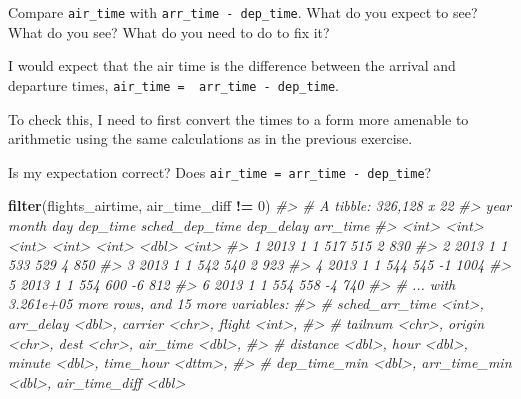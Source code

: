 \documentclass[]{book}
\newenvironment{Shaded}{\begin{snugshade}}{\end{snugshade}}
\newcommand{\CommentTok}[1]{\textcolor[rgb]{0.56,0.35,0.01}{\textit{#1}}}
\newcommand{\DataTypeTok}[1]{\textcolor[rgb]{0.13,0.29,0.53}{#1}}
\newcommand{\DecValTok}[1]{\textcolor[rgb]{0.00,0.00,0.81}{#1}}
\newcommand{\KeywordTok}[1]{\textcolor[rgb]{0.13,0.29,0.53}{\textbf{#1}}}
\newcommand{\NormalTok}[1]{#1}
\newcommand{\OperatorTok}[1]{\textcolor[rgb]{0.81,0.36,0.00}{\textbf{#1}}}
\newcommand{\StringTok}[1]{\textcolor[rgb]{0.31,0.60,0.02}{#1}}
\theoremstyle{plain}
\theoremstyle{remark}
\begin{document}
Compare \texttt{air\_time} with \texttt{arr\_time\ -\ dep\_time}. What
do you expect to see? What do you see? What do you need to do to fix it?

I would expect that the air time is the difference between the arrival
and departure times, \texttt{air\_time\ =\ \ arr\_time\ -\ dep\_time}.

To check this, I need to first convert the times to a form more amenable
to arithmetic using the same calculations as in the previous exercise.

\begin{Shaded}
\end{Shaded}

Is my expectation correct? Does
\texttt{air\_time\ =\ arr\_time\ -\ dep\_time}?

\begin{Shaded}
\begin{Highlighting}[]
\KeywordTok{filter}\NormalTok{(flights_airtime, air_time_diff }\OperatorTok{!=}\StringTok{ }\DecValTok{0}\NormalTok{)}
\CommentTok{#> # A tibble: 326,128 x 22}
\CommentTok{#>    year month   day dep_time sched_dep_time dep_delay arr_time}
\CommentTok{#>   <int> <int> <int>    <int>          <int>     <dbl>    <int>}
\CommentTok{#> 1  2013     1     1      517            515         2      830}
\CommentTok{#> 2  2013     1     1      533            529         4      850}
\CommentTok{#> 3  2013     1     1      542            540         2      923}
\CommentTok{#> 4  2013     1     1      544            545        -1     1004}
\CommentTok{#> 5  2013     1     1      554            600        -6      812}
\CommentTok{#> 6  2013     1     1      554            558        -4      740}
\CommentTok{#> # ... with 3.261e+05 more rows, and 15 more variables:}
\CommentTok{#> #   sched_arr_time <int>, arr_delay <dbl>, carrier <chr>, flight <int>,}
\CommentTok{#> #   tailnum <chr>, origin <chr>, dest <chr>, air_time <dbl>,}
\CommentTok{#> #   distance <dbl>, hour <dbl>, minute <dbl>, time_hour <dttm>,}
\CommentTok{#> #   dep_time_min <dbl>, arr_time_min <dbl>, air_time_diff <dbl>}
\end{Highlighting}
\end{Shaded}
\end{document}
